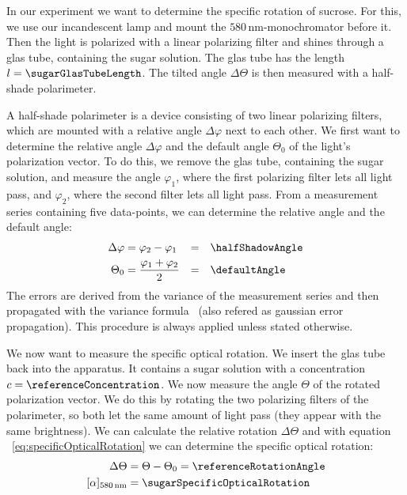 \documentclass[a4paper,10pt,twocolumn]{article}
\newcommand{\unit}[1]{\, \mathrm{#1}}
\newcommand{\nm}{\unit{nm}}
\newcommand{\wavelengthYellow}{580 \nm}
\newcommand{\specRot}{[\alpha]_{\wavelengthYellow}}
\begin{document}
    In our experiment we want to determine the specific rotation of sucrose.
    For this, we use our incandescent lamp and mount the $\wavelengthYellow$-monochromator
    before it.
    Then the light is polarized with a linear polarizing filter and shines through
    a glas tube, containing the sugar solution.
    The glas tube has the length $l = \sugarGlasTubeLength$.
    The tilted angle $\Delta \Theta$ is then measured with a half-shade polarimeter.
    
    A half-shade polarimeter is a device consisting of two linear polarizing filters, which are mounted
    with a relative angle $\Delta \varphi$ next to each other.
    We first want to determine the relative angle $\Delta \varphi$ and the default angle $\Theta_0$ of
    the light's polarization vector.
    To do this, we remove the glas tube, containing the sugar solution, and measure the angle 
    $\varphi_1$, where the first polarizing filter lets all light pass, and $\varphi_2$, where
    the second filter lets all light pass.
    From a measurement series containing five data-points, we can determine the relative angle
    and the default angle:
    \begin{align*}
        \Delta \varphi & = \varphi_2 - \varphi_1 & = & \quad \halfShadowAngle \\
        \Theta_0 & = \frac{\varphi_1 + \varphi_2}{2} & = & \quad \defaultAngle
    \end{align*}
    The errors are derived from the variance of the measurement series and then propagated with
    the variance formula~\cite{errorPropagation} (also refered as gaussian error propagation).
    This procedure is always applied unless stated otherwise.
    
    We now want to measure the specific optical rotation.
    We insert the glas tube back into the apparatus.
    It contains a sugar solution with a concentration $c = \referenceConcentration$.
    We now measure the angle $\Theta$ of the rotated polarization vector.
    We do this by rotating the two polarizing filters of the polarimeter, so both let the same amount of
    light pass (they appear with the same brightness).
    We can calculate the relative rotation $\Delta \Theta$ and with equation ~\eqref{eq:specificOpticalRotation}
    we can determine the specific optical rotation:
    \begin{align*}
        \Delta \Theta &= \Theta - \Theta_0 = \referenceRotationAngle \\
        \specRot &= \sugarSpecificOpticalRotation
    \end{align*}
    
\end{document}
